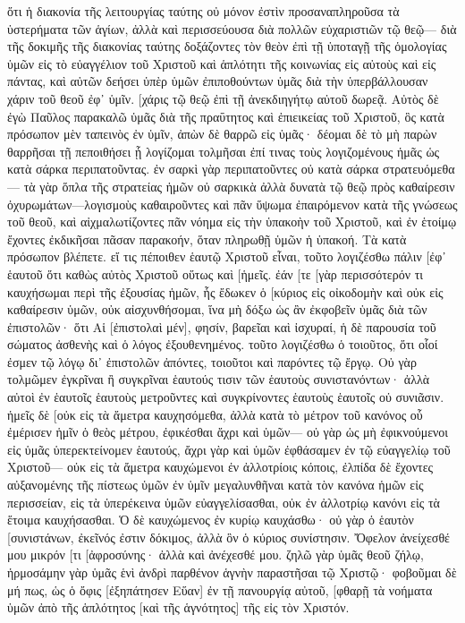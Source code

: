 ὅτι ἡ διακονία τῆς λειτουργίας ταύτης οὐ μόνον ἐστὶν προσαναπληροῦσα τὰ ὑστερήματα τῶν ἁγίων, ἀλλὰ καὶ περισσεύουσα διὰ πολλῶν εὐχαριστιῶν τῷ θεῷ— 
διὰ τῆς δοκιμῆς τῆς διακονίας ταύτης δοξάζοντες τὸν θεὸν ἐπὶ τῇ ὑποταγῇ τῆς ὁμολογίας ὑμῶν εἰς τὸ εὐαγγέλιον τοῦ Χριστοῦ καὶ ἁπλότητι τῆς κοινωνίας εἰς αὐτοὺς καὶ εἰς πάντας, 
καὶ αὐτῶν δεήσει ὑπὲρ ὑμῶν ἐπιποθούντων ὑμᾶς διὰ τὴν ὑπερβάλλουσαν χάριν τοῦ θεοῦ ἐφ᾽ ὑμῖν. 
[χάρις τῷ θεῷ ἐπὶ τῇ ἀνεκδιηγήτῳ αὐτοῦ δωρεᾷ. 
Αὐτὸς δὲ ἐγὼ Παῦλος παρακαλῶ ὑμᾶς διὰ τῆς πραΰτητος καὶ ἐπιεικείας τοῦ Χριστοῦ, ὃς κατὰ πρόσωπον μὲν ταπεινὸς ἐν ὑμῖν, ἀπὼν δὲ θαρρῶ εἰς ὑμᾶς· 
δέομαι δὲ τὸ μὴ παρὼν θαρρῆσαι τῇ πεποιθήσει ᾗ λογίζομαι τολμῆσαι ἐπί τινας τοὺς λογιζομένους ἡμᾶς ὡς κατὰ σάρκα περιπατοῦντας. 
ἐν σαρκὶ γὰρ περιπατοῦντες οὐ κατὰ σάρκα στρατευόμεθα— 
τὰ γὰρ ὅπλα τῆς στρατείας ἡμῶν οὐ σαρκικὰ ἀλλὰ δυνατὰ τῷ θεῷ πρὸς καθαίρεσιν ὀχυρωμάτων—λογισμοὺς καθαιροῦντες 
καὶ πᾶν ὕψωμα ἐπαιρόμενον κατὰ τῆς γνώσεως τοῦ θεοῦ, καὶ αἰχμαλωτίζοντες πᾶν νόημα εἰς τὴν ὑπακοὴν τοῦ Χριστοῦ, 
καὶ ἐν ἑτοίμῳ ἔχοντες ἐκδικῆσαι πᾶσαν παρακοήν, ὅταν πληρωθῇ ὑμῶν ἡ ὑπακοή. 
Τὰ κατὰ πρόσωπον βλέπετε. εἴ τις πέποιθεν ἑαυτῷ Χριστοῦ εἶναι, τοῦτο λογιζέσθω πάλιν [ἐφ᾽ ἑαυτοῦ ὅτι καθὼς αὐτὸς Χριστοῦ οὕτως καὶ [ἡμεῖς. 
ἐάν [τε [γὰρ περισσότερόν τι καυχήσωμαι περὶ τῆς ἐξουσίας ἡμῶν, ἧς ἔδωκεν ὁ [κύριος εἰς οἰκοδομὴν καὶ οὐκ εἰς καθαίρεσιν ὑμῶν, οὐκ αἰσχυνθήσομαι, 
ἵνα μὴ δόξω ὡς ἂν ἐκφοβεῖν ὑμᾶς διὰ τῶν ἐπιστολῶν· 
ὅτι Αἱ [ἐπιστολαὶ μέν], φησίν, βαρεῖαι καὶ ἰσχυραί, ἡ δὲ παρουσία τοῦ σώματος ἀσθενὴς καὶ ὁ λόγος ἐξουθενημένος. 
τοῦτο λογιζέσθω ὁ τοιοῦτος, ὅτι οἷοί ἐσμεν τῷ λόγῳ δι᾽ ἐπιστολῶν ἀπόντες, τοιοῦτοι καὶ παρόντες τῷ ἔργῳ. 
Οὐ γὰρ τολμῶμεν ἐγκρῖναι ἢ συγκρῖναι ἑαυτούς τισιν τῶν ἑαυτοὺς συνιστανόντων· ἀλλὰ αὐτοὶ ἐν ἑαυτοῖς ἑαυτοὺς μετροῦντες καὶ συγκρίνοντες ἑαυτοὺς ἑαυτοῖς οὐ συνιᾶσιν. 
ἡμεῖς δὲ [οὐκ εἰς τὰ ἄμετρα καυχησόμεθα, ἀλλὰ κατὰ τὸ μέτρον τοῦ κανόνος οὗ ἐμέρισεν ἡμῖν ὁ θεὸς μέτρου, ἐφικέσθαι ἄχρι καὶ ὑμῶν— 
οὐ γὰρ ὡς μὴ ἐφικνούμενοι εἰς ὑμᾶς ὑπερεκτείνομεν ἑαυτούς, ἄχρι γὰρ καὶ ὑμῶν ἐφθάσαμεν ἐν τῷ εὐαγγελίῳ τοῦ Χριστοῦ— 
οὐκ εἰς τὰ ἄμετρα καυχώμενοι ἐν ἀλλοτρίοις κόποις, ἐλπίδα δὲ ἔχοντες αὐξανομένης τῆς πίστεως ὑμῶν ἐν ὑμῖν μεγαλυνθῆναι κατὰ τὸν κανόνα ἡμῶν εἰς περισσείαν, 
εἰς τὰ ὑπερέκεινα ὑμῶν εὐαγγελίσασθαι, οὐκ ἐν ἀλλοτρίῳ κανόνι εἰς τὰ ἕτοιμα καυχήσασθαι. 
Ὁ δὲ καυχώμενος ἐν κυρίῳ καυχάσθω· 
οὐ γὰρ ὁ ἑαυτὸν [συνιστάνων, ἐκεῖνός ἐστιν δόκιμος, ἀλλὰ ὃν ὁ κύριος συνίστησιν. 
Ὄφελον ἀνείχεσθέ μου μικρόν [τι [ἀφροσύνης· ἀλλὰ καὶ ἀνέχεσθέ μου. 
ζηλῶ γὰρ ὑμᾶς θεοῦ ζήλῳ, ἡρμοσάμην γὰρ ὑμᾶς ἑνὶ ἀνδρὶ παρθένον ἁγνὴν παραστῆσαι τῷ Χριστῷ· 
φοβοῦμαι δὲ μή πως, ὡς ὁ ὄφις [ἐξηπάτησεν Εὕαν] ἐν τῇ πανουργίᾳ αὐτοῦ, [φθαρῇ τὰ νοήματα ὑμῶν ἀπὸ τῆς ἁπλότητος [καὶ τῆς ἁγνότητος] τῆς εἰς τὸν Χριστόν. 
